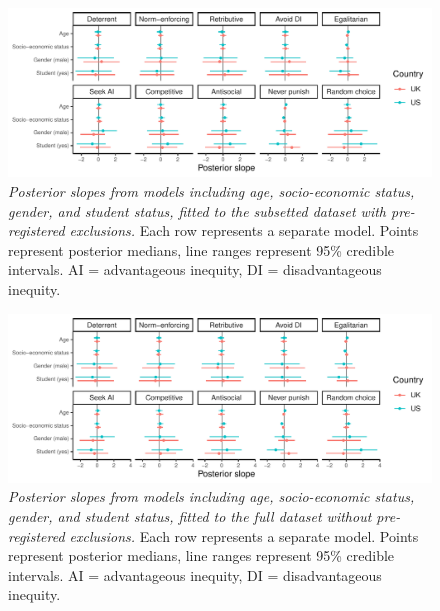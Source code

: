\documentclass[
  english,
  man, donotrepeattitle,floatsintext]{apa6}
\begin{document}
\begin{figure}
\centering
\includegraphics{manuscript_files/figure-latex/plotAllDems2-1.pdf}
\caption{\label{fig:plotAllDems2}\emph{Posterior slopes from models including age,
socio-economic status, gender, and student status, fitted to the subsetted
dataset with pre-registered exclusions.} Each row represents a separate model.
Points represent posterior medians, line ranges represent 95\% credible
intervals. AI = advantageous inequity, DI = disadvantageous inequity.}
\end{figure}

\newpage







\begin{figure}
\centering
\includegraphics{manuscript_files/figure-latex/plotAllDems1-1.pdf}
\caption{\label{fig:plotAllDems1}\emph{Posterior slopes from models including age,
socio-economic status, gender, and student status, fitted to the full dataset
without pre-registered exclusions.} Each row represents a separate model. Points
represent posterior medians, line ranges represent 95\% credible intervals. AI =
advantageous inequity, DI = disadvantageous inequity.}
\end{figure}

\newpage
\end{document}
